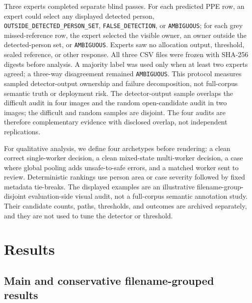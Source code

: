 \documentclass[iicol,pdflatex,sn-mathphys-num]{sn-jnl}
\begin{document}
Three experts completed separate blind passes. For each predicted PPE row, an expert could select any displayed detected person, \texttt{OUTSIDE\_DETECTED\_PERSON\_SET}, \texttt{FALSE\_DETECTION}, or \texttt{AMBIGUOUS}; for each grey missed-reference row, the expert selected the visible owner, an owner outside the detected-person set, or \texttt{AMBIGUOUS}. Experts saw no allocation output, threshold, sealed reference, or other response. All three CSV files were frozen with SHA-256 digests before analysis. A majority label was used only when at least two experts agreed; a three-way disagreement remained \texttt{AMBIGUOUS}. This protocol measures sampled detector-output ownership and failure decomposition, not full-corpus semantic truth or deployment risk. The detector-output sample overlaps the difficult audit in four images and the random open-candidate audit in two images; the difficult and random samples are disjoint. The four audits are therefore complementary evidence with disclosed overlap, not independent replications.

For qualitative analysis, we define four archetypes before rendering: a clean correct single-worker decision, a clean mixed-state multi-worker decision, a case where global pooling adds unsafe-to-safe errors, and a matched worker sent to review. Deterministic rankings use person area or case severity followed by fixed metadata tie-breaks. The displayed examples are an illustrative filename-group-disjoint evaluation-side visual audit, not a full-corpus semantic annotation study. Their candidate counts, paths, thresholds, and outcomes are archived separately, and they are not used to tune the detector or threshold.

\section{Results}\label{sec:results}

\subsection{Main and conservative filename-grouped results}
\end{document}
